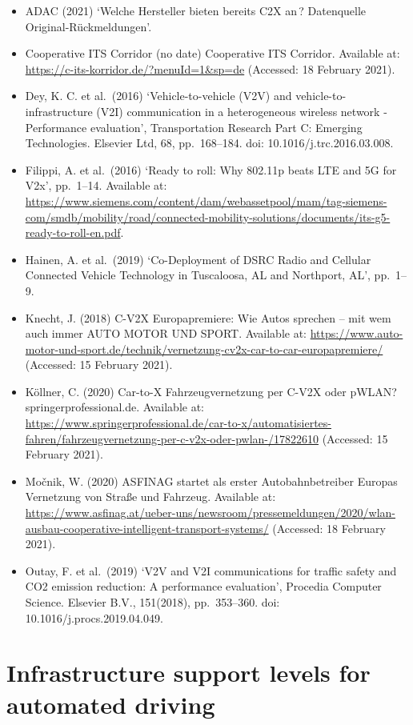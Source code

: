 \documentclass[
]{book}
\providecommand{\tightlist}{%
  \setlength{\itemsep}{0pt}\setlength{\parskip}{0pt}}
\begin{document}
\begin{itemize}
\tightlist
\item
  ADAC (2021) `Welche Hersteller bieten bereits C2X an\,? Datenquelle Original-Rückmeldungen'.
\item
  Cooperative ITS Corridor (no date) Cooperative ITS Corridor. Available at: \url{https://c-its-korridor.de/?menuId=1\&sp=de} (Accessed: 18 February 2021).
\item
  Dey, K. C. et al.~(2016) `Vehicle-to-vehicle (V2V) and vehicle-to-infrastructure (V2I) communication in a heterogeneous wireless network - Performance evaluation', Transportation Research Part C: Emerging Technologies. Elsevier Ltd, 68, pp.~168--184. doi: 10.1016/j.trc.2016.03.008.
\item
  Filippi, A. et al.~(2016) `Ready to roll: Why 802.11p beats LTE and 5G for V2x', pp.~1--14. Available at: \url{https://www.siemens.com/content/dam/webassetpool/mam/tag-siemens-com/smdb/mobility/road/connected-mobility-solutions/documents/its-g5-ready-to-roll-en.pdf}.
\item
  Hainen, A. et al.~(2019) `Co-Deployment of DSRC Radio and Cellular Connected Vehicle Technology in Tuscaloosa, AL and Northport, AL', pp.~1--9.
\item
  Knecht, J. (2018) C-V2X Europapremiere: Wie Autos sprechen -- mit wem auch immer \textbar{} AUTO MOTOR UND SPORT. Available at: \url{https://www.auto-motor-und-sport.de/technik/vernetzung-cv2x-car-to-car-europapremiere/} (Accessed: 15 February 2021).
\item
  Köllner, C. (2020) Car-to-X \textbar{} Fahrzeugvernetzung per C-V2X oder pWLAN? \textbar{} springerprofessional.de. Available at: \url{https://www.springerprofessional.de/car-to-x/automatisiertes-fahren/fahrzeugvernetzung-per-c-v2x-oder-pwlan-/17822610} (Accessed: 15 February 2021).
\item
  Močnik, W. (2020) ASFINAG startet als erster Autobahnbetreiber Europas Vernetzung von Straße und Fahrzeug. Available at: \url{https://www.asfinag.at/ueber-uns/newsroom/pressemeldungen/2020/wlan-ausbau-cooperative-intelligent-transport-systems/} (Accessed: 18 February 2021).
\item
  Outay, F. et al.~(2019) `V2V and V2I communications for traffic safety and CO2 emission reduction: A performance evaluation', Procedia Computer Science. Elsevier B.V., 151(2018), pp.~353--360. doi: 10.1016/j.procs.2019.04.049.
\end{itemize}

\hypertarget{infrast_support_level}{%
\section{Infrastructure support levels for automated driving}\label{infrast_support_level}}
\end{document}
